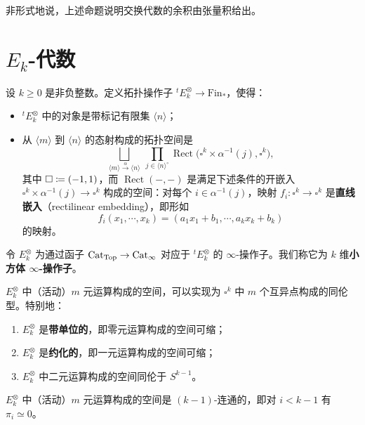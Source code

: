 \begin{remark}\label{L26-3.9}
非形式地说，上述命题说明交换代数的余积由张量积给出。
\end{remark}

\section{$E_{k}$-代数}

\begin{definition}\label{L26-4.1}
设 $k\ge0$ 是非负整数。定义拓扑操作子 ${}^{t}E_{k}^{\otimes}\to\mathrm{Fin}_{*}$，使得：
\begin{itemize}[leftmargin=2.2em,itemsep=0.1em]
\item ${}^{t}E_{k}^{\otimes}$ 中的对象是带标记有限集 $\langle n\rangle$；
\item 从 $\langle m\rangle$ 到 $\langle n\rangle$ 的态射构成的拓扑空间是
\[
\bigsqcup_{\langle m\rangle\xrightarrow{\alpha}\langle n\rangle}\ \prod_{j\in\langle n\rangle^{\circ}}\operatorname{Rect}\bigl(\square^{k}\times\alpha^{-1}(j),\square^{k}\bigr),
\]
其中 $\square\coloneqq(-1,1)$，而 $\operatorname{Rect}(-,-)$ 是满足下述条件的开嵌入 $\square^{k}\times\alpha^{-1}(j)\to\square^{k}$ 构成的空间：对每个 $i\in\alpha^{-1}(j)$，映射 $f_{i}\colon\square^{k}\to\square^{k}$ 是\textbf{直线嵌入}（rectilinear embedding），即形如
\[
f_{i}(x_{1},\cdots,x_{k})=(a_{1}x_{1}+b_{1},\cdots,a_{k}x_{k}+b_{k})
\]
的映射。
\end{itemize}
令 $E_{k}^{\otimes}$ 为通过函子 $\operatorname{Cat}_{\mathrm{Top}}\to\operatorname{Cat}_{\infty}$ 对应于 ${}^{t}E_{k}^{\otimes}$ 的 $\infty$-操作子。我们称它为 $k$ 维\textbf{小方体 $\infty$-操作子}。
\end{definition}

\begin{exercise}\label{L26-4.2}
$E_{k}^{\otimes}$ 中（活动）$m$ 元运算构成的空间，可以实现为 $\square^{k}$ 中 $m$ 个互异点构成的同伦型。特别地：
\begin{enumerate}[label=(\arabic*),start=0,leftmargin=2.4em,itemsep=0.1em]
\item $E_{k}^{\otimes}$ 是\textbf{带单位的}，即零元运算构成的空间可缩；
\item $E_{k}^{\otimes}$ 是\textbf{约化的}，即一元运算构成的空间可缩；
\item $E_{k}^{\otimes}$ 中二元运算构成的空间同伦于 $S^{k-1}$。
\end{enumerate}
\end{exercise}

\begin{exercise}\label{L26-4.3}
$E_{k}^{\otimes}$ 中（活动）$m$ 元运算构成的空间是 $(k-1)$-连通的，即对 $i<k-1$ 有 $\pi_{i}\simeq0$。
\end{exercise}

